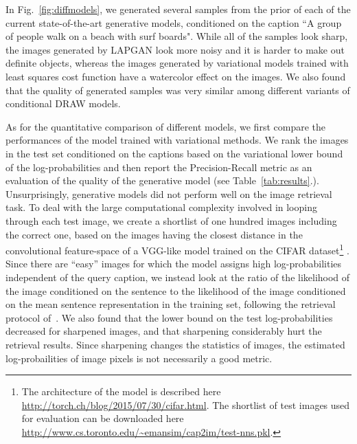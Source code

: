 \documentclass{article} %
\newcommand{\Figref}[1]{Fig.~\ref{#1}}
\begin{document}
In \Figref{fig:diffmodels}, we generated several samples from the prior of each of the current state-of-the-art generative models, conditioned on the caption ``A group of people walk on a beach with surf boards". While all of the samples look sharp, the images generated by LAPGAN look more noisy and it is harder to make out definite objects, whereas the images generated by variational models trained with least squares cost function have a watercolor effect on the images. We also found that the quality of generated samples was very similar among different variants of conditional DRAW models.

As for the quantitative comparison of different models, we first compare the performances of the model trained with variational methods. We rank the images in the test set conditioned on the captions based on the variational lower bound of the log-probabilities 
and then report the Precision-Recall metric as an evaluation of the quality of the generative model (see Table~\ref{tab:results}.). Unsurprisingly, generative models did not perform well on the image retrieval task. To deal with the large computational complexity involved in looping through each test image, we create a shortlist of one hundred images including the correct one, based on the images having the closest distance in the convolutional feature-space of a VGG-like model \citep{simonyan_convnet} trained on the CIFAR dataset\footnote{The architecture of the model is described here \url{http://torch.ch/blog/2015/07/30/cifar.html}. The shortlist of test images used for evaluation can be downloaded here \url{http://www.cs.toronto.edu/~emansim/cap2im/test-nns.pkl}.} \citep{krizhevsky_cifar}. 
Since there are ``easy'' images for which the model assigns high log-probabilities independent of the query caption, 
we instead look at the ratio of 
the likelihood of the image conditioned on the sentence to the likelihood of the image conditioned on the mean sentence representation in the training set, following the retrieval protocol of~\citep{kiros_captions}.
We also found that the lower bound on the test log-probabilities decreased for sharpened images, and that sharpening considerably hurt the retrieval results. Since sharpening changes the statistics of images, the estimated log-probailities of image pixels is not necessarily a good metric.
\end{document}

